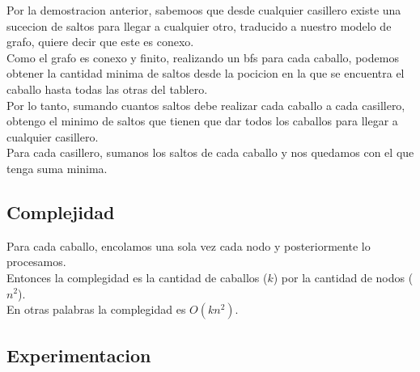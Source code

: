 Por la demostracion anterior, sabemoos que desde cualquier casillero existe una sucecion de saltos para llegar a cualquier otro, traducido a nuestro modelo de grafo, quiere decir que este es conexo.
\\
Como el grafo es conexo y finito, realizando un bfs para cada caballo, podemos obtener la cantidad minima de saltos desde la pocicion en la que se encuentra el caballo hasta todas las otras del tablero.
\\
Por lo tanto, sumando cuantos saltos debe realizar cada caballo a cada casillero, obtengo el minimo de saltos que tienen que dar todos los caballos para llegar a cualquier casillero.
\\
Para cada casillero, sumanos los saltos de cada caballo y nos quedamos con el que tenga suma minima.

\subsection{Complejidad}
Para cada caballo, encolamos una sola vez cada nodo y posteriormente lo procesamos.
\\
Entonces la complegidad es la cantidad de caballos ($k$) por la cantidad de nodos ($n^2$).
\\
En otras palabras la complegidad es $O(kn^2)$.

\subsection{Experimentacion}
